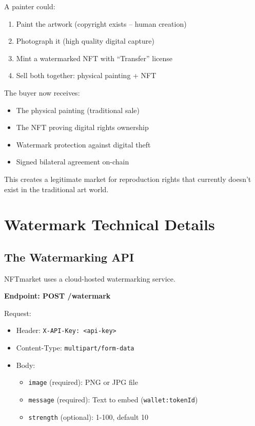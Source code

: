\documentclass[11pt,a4paper]{article}
\newcommand{\code}[1]{\texttt{#1}}
\begin{document}
A painter could:

\begin{enumerate}
    \item Paint the artwork (copyright exists -- human creation)
    \item Photograph it (high quality digital capture)
    \item Mint a watermarked NFT with ``Transfer'' license
    \item Sell both together: physical painting + NFT
\end{enumerate}

The buyer now receives:
\begin{itemize}
    \item The physical painting (traditional sale)
    \item The NFT proving digital rights ownership
    \item Watermark protection against digital theft
    \item Signed bilateral agreement on-chain
\end{itemize}

This creates a legitimate market for reproduction rights that currently doesn't exist in the traditional art world.

\newpage
\section{Watermark Technical Details}

\subsection{The Watermarking API}

NFTmarket uses a cloud-hosted watermarking service.

\textbf{Endpoint: POST /watermark}

Request:
\begin{itemize}
    \item Header: \code{X-API-Key: <api-key>}
    \item Content-Type: \code{multipart/form-data}
    \item Body:
    \begin{itemize}
        \item \code{image} (required): PNG or JPG file
        \item \code{message} (required): Text to embed (\code{wallet:tokenId})
        \item \code{strength} (optional): 1-100, default 10
    \end{itemize}
\end{itemize}
\end{document}
